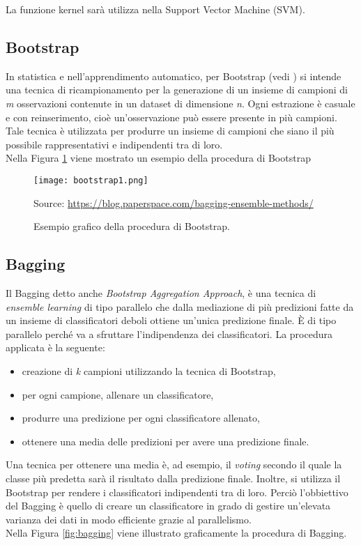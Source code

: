 La funzione kernel sarà utilizza nella Support Vector Machine (SVM).

\subsection{Bootstrap}
In statistica e nell'apprendimento automatico, per Bootstrap (vedi \textit{\cite{bootstrap}}) si intende una tecnica di ricampionamento per la generazione di un insieme di campioni di \emph{m} osservazioni contenute in un dataset di dimensione \emph{n}. Ogni estrazione è casuale e con reinserimento, cioè un’osservazione può essere presente in più campioni. Tale tecnica è utilizzata per produrre un insieme di campioni che siano il più possibile rappresentativi e indipendenti tra di loro.\\
Nella Figura \ref{fig:bootstrap} viene mostrato un esempio della procedura di Bootstrap

\begin{figure}[h]
	\begin{center}
		\texttt{[image: bootstrap1.png]}
		\caption{Esempio grafico della procedura di Bootstrap.
		} 
		Source: \url{https://blog.paperspace.com/bagging-ensemble-methods/}\label{fig:bootstrap}
	\end{center}
\end{figure}

\subsection{Bagging}
Il Bagging \autocite{breiman1996bagging} detto anche \emph{Bootstrap Aggregation Approach}, è una tecnica di \emph{ensemble learning} di tipo parallelo che dalla mediazione di più predizioni fatte da un insieme di classificatori deboli ottiene un'unica predizione finale. È di tipo parallelo perché va a sfruttare l'indipendenza dei classificatori. La procedura applicata è la seguente:
\begin{itemize}
	\item creazione di \emph{k} campioni utilizzando la tecnica di Bootstrap,
	\item per ogni campione, allenare un classificatore,
	\item produrre una predizione per ogni classificatore allenato,
	\item ottenere una media delle predizioni per avere una predizione finale.
\end{itemize} 
Una tecnica per ottenere una media è, ad esempio, il \emph{voting} secondo il quale la classe più predetta sarà il risultato dalla predizione finale. Inoltre, si utilizza il Bootstrap per rendere i classificatori indipendenti tra di loro.
Perciò l'obbiettivo del Bagging è quello di creare un classificatore in grado di gestire un'elevata varianza dei dati in modo efficiente grazie al parallelismo.\\
Nella Figura \ref{fig:bagging} viene illustrato graficamente la procedura di Bagging.


